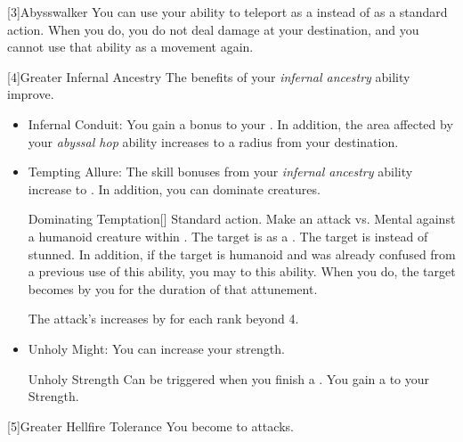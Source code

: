       [3]{Abysswalker} You can use your  ability to teleport as a  instead of as a standard action.
      When you do, you do not deal damage at your destination, and you  cannot use that ability as a movement again.

      [4]{Greater Infernal Ancestry} The benefits of your \textit{infernal ancestry} ability improve.
      \begin{itemize}
        \item Infernal Conduit: You gain a  bonus to your .
          In addition, the area affected by your \textit{abyssal hop} ability increases to a \smallarea radius from your destination.
        \item Tempting Allure: The skill bonuses from your \textit{infernal ancestry} ability increase to .
          In addition, you can dominate creatures.
          \begin{magicalactiveability}{Dominating Temptation}[]
            \abilityusagetime Standard action.
            \rankline
            Make an attack vs. Mental against a humanoid creature within \shortrange.
            \hit The target is \stunned as a .
            \crit The target is \confused instead of stunned.
            In addition, if the target is humanoid and was already confused from a previous use of this ability, you may  to this ability.
            When you do, the target becomes \dominated by you for the duration of that attunement.

            \rankline
            \noindent The attack's  increases by  for each rank beyond 4.
          \end{magicalactiveability}
        \item Unholy Might: You can increase your strength.
          \begin{magicalattuneability}{Unholy Strength}{}
            \abilityusagetime Can be triggered when you finish a .
            \rankline
            You gain a   to your Strength.
          \end{magicalattuneability}
      \end{itemize}

    [5]{Greater Hellfire Tolerance} You become  to \atFire attacks.

